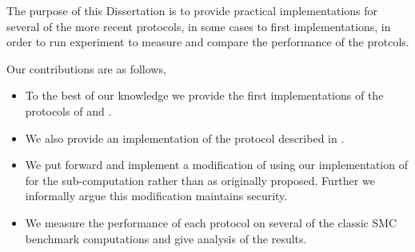 \documentclass[ %
                    author={Nicholas Tutte},
                supervisor={Prof. Nigel Smart},
                    degree={MEng},
                     title={Secure Two Party Computation},
                  subtitle={A practical comparison of recent protocols},
                      type={Research - GG1K},
                      year={2015} ]{dissertation}
\begin{document}
		The purpose of this Dissertation is to provide practical implementations for several of the more recent protocols, in some cases to first implementations, in order to run experiment to measure and compare the performance of the protcols.


		Our contributions are as follows,

		\begin{itemize}
			\item To the best of our knowledge we provide the first implementations of the protocols of \cite{LindellAndPinkas2011} and \cite{Lindell_CnC_2013}.
			\item We also provide an implementation of the protocol described in \cite{Katz_Symm_CnC_2013}.
			\item We put forward and implement a modification of \cite{Lindell_CnC_2013} using our implementation of \cite{Katz_Symm_CnC_2013} for the sub-computation rather than \cite{LindellAndPinkas2011} as originally proposed. Further we informally argue this modification maintains security.
			\item We measure the performance of each protocol on several of the classic SMC benchmark computations and give analysis of the results.

		\end{itemize}


\end{document}
